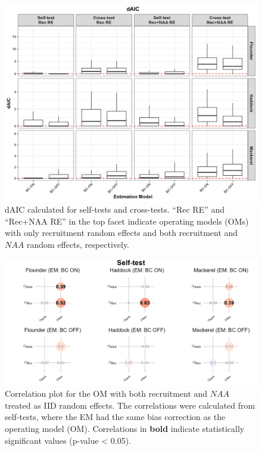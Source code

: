 \documentclass[
  12pt,
]{article}
\begin{document}
\begin{figure}[H]
    \centering
    \includegraphics[width=\textwidth]{Revised_Figures&Tables/dAIC.PNG}
    \caption{dAIC calculated for self-tests and cross-tests. ``Rec RE'' and ``Rec+NAA RE'' in the top facet indicate operating models (OMs) with only recruitment random effects and both recruitment and $NAA$ random effects, respectively.}
    \label{fig:supp_dAIC}
\end{figure}

\begin{figure}[H]
    \centering
    \includegraphics[width=\textwidth]{Revised_Figures&Tables/Correlation_plot_NAA_iid.PNG}
    \caption{Correlation plot for the OM with both recruitment and $NAA$ treated as IID random effects. The correlations were calculated from self-tests, where the EM had the same bias correction as the operating model (OM). Correlations in \textbf{bold} indicate statistically significant values (p-value < 0.05).}
    \label{fig:supp_Cor_NAA_iid}
\end{figure}
\end{document}
